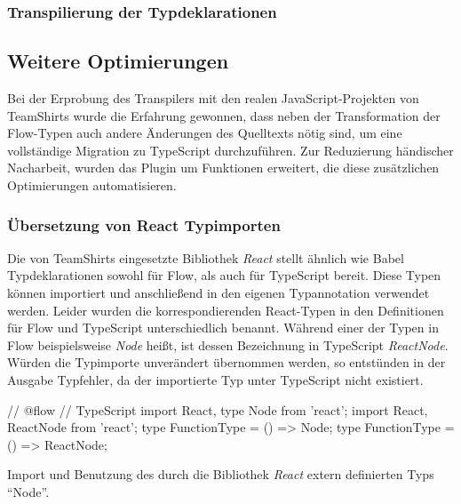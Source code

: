 \bigbreak


\subsubsection{Transpilierung der Typdeklarationen}




\bigbreak


\subsection{Weitere Optimierungen}
\label{subsec:optimizations}

Bei der Erprobung des Transpilers mit den realen JavaScript-Projekten von TeamShirts wurde die Erfahrung gewonnen, dass neben der Transformation der Flow-Typen auch andere Änderungen des Quelltexts nötig sind, um eine vollständige Migration zu TypeScript durchzuführen. Zur Reduzierung händischer Nacharbeit, wurden das Plugin um Funktionen erweitert, die diese zusätzlichen Optimierungen automatisieren.

\subsubsection{Übersetzung von React Typimporten}
\label{subsec:react-type-import-mapping}

Die von TeamShirts eingesetzte Bibliothek \textit{React} stellt ähnlich wie Babel Typdeklarationen sowohl für Flow, als auch für TypeScript bereit. Diese Typen können importiert und anschließend in den eigenen Typannotation verwendet werden. Leider wurden die korrespondierenden React-Typen in den Definitionen für Flow und TypeScript unterschiedlich benannt. Während einer der Typen in Flow beispielsweise \textit{Node} heißt, ist dessen Bezeichnung in TypeScript \textit{ReactNode}. Würden die Typimporte unverändert übernommen werden, so entstünden in der Ausgabe Typfehler, da der importierte Typ unter TypeScript nicht existiert.

\bigbreak
\begin{listing}[htb]
\begin{textcode}
// @flow                                        // TypeScript
import React, { type Node } from 'react';       import React, { ReactNode } from 'react';
type FunctionType = () => Node;                 type FunctionType = () => ReactNode;
\end{textcode}
\listingvspace
\caption{Import und Benutzung des durch die Bibliothek \textit{React} extern definierten Typs \enquote{Node}.}
\label{code:react-imports}
\end{listing}

